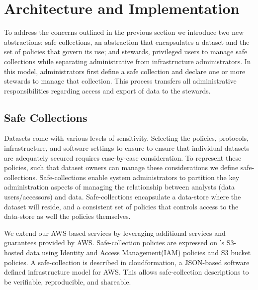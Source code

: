 \section{Architecture and Implementation}
\label{sec:architecture}


To address the concerns outlined in the previous section we introduce two
new abstractions: safe collections, an abstraction that encapsulates
a dataset and the set of policies that govern its use; and stewards, privileged users
to manage safe collections while separating administrative from infrastructure
administrators.  
In this model, administrators first define a safe collection and declare one 
or more stewards to manage that collection. This process transfers
all administrative responsibilities regarding access and export of data to the stewards.

\subsection{Safe Collections}

Datasets come with various levels of sensitivity. Selecting the policies, protocols, infrastructure, and 
software settings to ensure to ensure that individual datasets are adequately secured requires
case-by-case consideration. To represent these policies, such that dataset owners can manage these considerations
we define safe-collections. Safe-collections enable system administrators to partition the key administration
aspects of managing the relationship between analysts (data users/accessors) and data. 
Safe-collections encapsulate a data-store where the dataset will reside, and a consistent set of policies
that controls access to the data-store as well the policies themselves.

We extend our AWS-based \NAME services by leveraging additional
services and guarantees provided by AWS. 
Safe-collection policies are expressed on \NAMENS's S3-hosted data
using Identity and Access Management(IAM) policies and S3 bucket policies.
A safe-collection is described in cloudformation, a JSON-based software defined infrastructure model for AWS.
This allows safe-collection descriptions to be verifiable, reproducible, and shareable.

